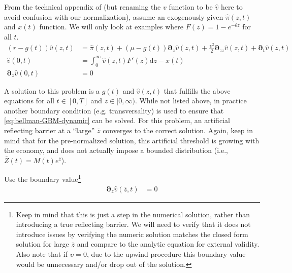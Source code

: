 \documentclass[11pt]{article}
\newcommand{\D}[1][]{\ensuremath{\boldsymbol{\partial}_{#1}}}
\newcommand{\diff}{\ensuremath{\mathrm{d}}}
\begin{document}
From the technical appendix of \cite{BenhabibPerlaTonetti2017} (but renaming the $v$ function to be $\hat{v}$ here to avoid confusion with our normalization), assume an exogenously given $\hat{\pi}(z,t)$ and $x(t)$ function.  We will only look at examples where $F(z) = 1 - e^{-\theta z}$ for all $t$.
\begin{align}
(r - g(t)) \hat{v}(z,t) &= \hat{\pi}(z,t) + (\mu- g(t)) \D[z] \hat{v}(z,t) + \frac{\upsilon^2}{2} \D[zz] \hat{v}(z,t) + \D[t]\hat{v}(z,t)\label{eq:bellman-GBM-dynamic}	\\
\hat{v}(0,t) &= \int_{0}^{\infty} \hat{v}(z,t) F'(z)\diff z - x(t)\label{eq:vm-GBM-dynamic}\\
\D[z]\hat{v}(0,t) &= 0\label{eq:sp-GBM-dynamic}
\end{align}

A solution to this problem is a $g(t)$ and $\hat{v}(z,t)$ that fulfills the above equations for all $t\in[0,T]$ and $z\in[0,\infty)$.  While not listed above, in practice another boundary condition (e.g. transversality) is used to ensure that \cref{eq:bellman-GBM-dynamic} can be solved. For this problem, an artificial reflecting barrier at a ``large'' $\bar{z}$ converges to the correct solution.  Again, keep in mind that for the pre-normalized solution, this artificial threshold is growing with the economy, and does not actually impose a bounded distribution (i.e., $\bar{Z}(t) = M(t) e^{\bar{z}}$).

Use the boundary value\footnote{Keep in mind that this is just a step in the numerical solution, rather than introducing a true reflecting barrier.  We will need to verify that it does not introduce issues by verifying the numeric solution matches the closed form solution for large $\bar{z}$ and compare to the analytic equation for external validity.  Also note that if $\upsilon = 0$, due to the upwind procedure this boundary value would be unnecessary and/or drop out of the solution.}
	\begin{align}
	\D[z]\hat{v}(\bar{z},t) &= 0\label{eq:reflecting-GBM-dynamic}
	\end{align}
\end{document}
